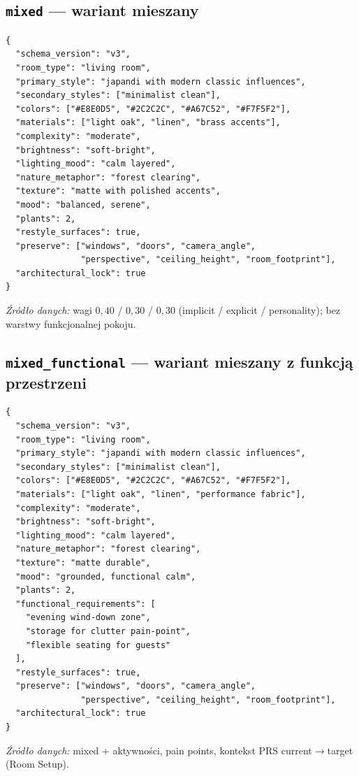 \subsection{\texttt{mixed} --- wariant mieszany}
\label{app:d:sec:mixed}

\begin{lstlisting}
{
  "schema_version": "v3",
  "room_type": "living room",
  "primary_style": "japandi with modern classic influences",
  "secondary_styles": ["minimalist clean"],
  "colors": ["#E8E0D5", "#2C2C2C", "#A67C52", "#F7F5F2"],
  "materials": ["light oak", "linen", "brass accents"],
  "complexity": "moderate",
  "brightness": "soft-bright",
  "lighting_mood": "calm layered",
  "nature_metaphor": "forest clearing",
  "texture": "matte with polished accents",
  "mood": "balanced, serene",
  "plants": 2,
  "restyle_surfaces": true,
  "preserve": ["windows", "doors", "camera_angle",
               "perspective", "ceiling_height", "room_footprint"],
  "architectural_lock": true
}
\end{lstlisting}

\noindent\textit{Źródło danych:} wagi $0{,}40$ / $0{,}30$ / $0{,}30$ (implicit / explicit / personality); bez warstwy funkcjonalnej pokoju.

\subsection{\texttt{mixed\_functional} --- wariant mieszany z funkcją przestrzeni}
\label{app:d:sec:mixed-functional}

\begin{lstlisting}
{
  "schema_version": "v3",
  "room_type": "living room",
  "primary_style": "japandi with modern classic influences",
  "secondary_styles": ["minimalist clean"],
  "colors": ["#E8E0D5", "#2C2C2C", "#A67C52", "#F7F5F2"],
  "materials": ["light oak", "linen", "performance fabric"],
  "complexity": "moderate",
  "brightness": "soft-bright",
  "lighting_mood": "calm layered",
  "nature_metaphor": "forest clearing",
  "texture": "matte durable",
  "mood": "grounded, functional calm",
  "plants": 2,
  "functional_requirements": [
    "evening wind-down zone",
    "storage for clutter pain-point",
    "flexible seating for guests"
  ],
  "restyle_surfaces": true,
  "preserve": ["windows", "doors", "camera_angle",
               "perspective", "ceiling_height", "room_footprint"],
  "architectural_lock": true
}
\end{lstlisting}

\noindent\textit{Źródło danych:} mixed + aktywności, pain points, kontekst PRS current$\rightarrow$target (Room Setup).

